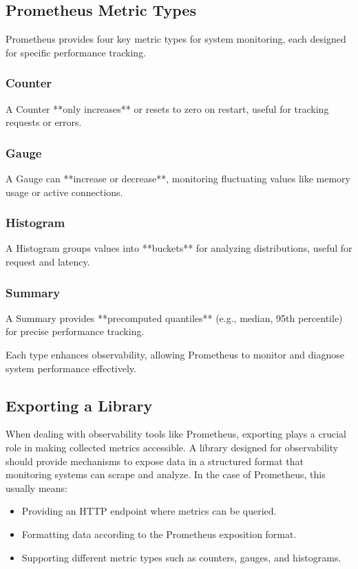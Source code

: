 \documentclass[a4paper,twoside,11pt]{article}
\begin{document}
\subsection{Prometheus Metric Types}
Prometheus provides four key metric types for system monitoring, each designed for specific performance tracking.

\subsubsection{Counter}
A Counter **only increases** or resets to zero on restart, useful for tracking requests or errors.

\subsubsection{Gauge}
A Gauge can **increase or decrease**, monitoring fluctuating values like memory usage or active connections.

\subsubsection{Histogram}
A Histogram groups values into **buckets** for analyzing distributions, useful for request and latency.

\subsubsection{Summary}
A Summary provides **precomputed quantiles** (e.g., median, 95th percentile) for precise performance tracking.

Each type enhances observability, allowing Prometheus to monitor and diagnose system performance effectively.

\subsection{Exporting a Library}
When dealing with observability tools like Prometheus, exporting plays a crucial role in making collected metrics accessible. A library designed for observability should provide mechanisms to expose data in a structured format that monitoring systems can scrape and analyze. In the case of Prometheus, this usually means:
\begin{itemize}
    \item Providing an HTTP endpoint where metrics can be queried.
    \item Formatting data according to the Prometheus exposition format.
    \item Supporting different metric types such as counters, gauges, and histograms.
\end{itemize}
\end{document}
